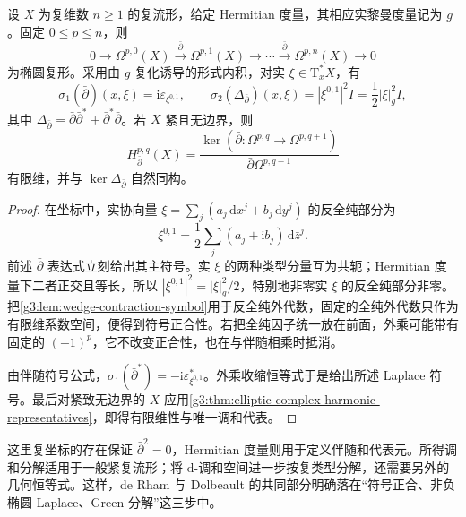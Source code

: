 \begin{proposition}\label{g3:prop:dolbeault-elliptic-symbol}
	设 \(X\) 为复维数 \(n\ge1\) 的复流形，给定 Hermitian 度量，其相应实黎曼度量记为 \(g\)。固定 \(0\le p\le n\)，则
	\[
		0\longrightarrow\Omega^{p,0}(X)\xrightarrow{\bar\partial}
		\Omega^{p,1}(X)\longrightarrow\cdots
		\xrightarrow{\bar\partial}\Omega^{p,n}(X)\longrightarrow0
	\]
	为椭圆复形。采用由 \(g\) 复化诱导的形式内积，对实 \(\xi\in\mathrm T_x^*X\)，有
	\[
		\sigma_1(\bar\partial)(x,\xi)=\mathrm i\varepsilon_{\xi^{0,1}},
		\qquad
		\sigma_2(\Delta_{\bar\partial})(x,\xi)
		=|\xi^{0,1}|^2I=\frac12|\xi|_g^2I,
	\]
	其中 \(\Delta_{\bar\partial}=\bar\partial\bar\partial^*+\bar\partial^*\bar\partial\)。若 \(X\) 紧且无边界，则
	\[
		H_{\bar\partial}^{p,q}(X)
		=\frac{\ker(\bar\partial:\Omega^{p,q}\to\Omega^{p,q+1})}
		{\bar\partial\Omega^{p,q-1}}
	\]
	有限维，并与 \(\ker\Delta_{\bar\partial}\) 自然同构。
\end{proposition}
\begin{proof}
	在坐标中，实协向量 \(\xi=\sum_j(a_j\,\mathrm dx^j+b_j\,\mathrm dy^j)\) 的反全纯部分为
	\[
		\xi^{0,1}=\frac12\sum_j(a_j+\mathrm i b_j)\,\mathrm d\bar z^j.
	\]
	前述 \(\bar\partial\) 表达式立刻给出其主符号。实 \(\xi\) 的两种类型分量互为共轭；Hermitian 度量下二者正交且等长，所以 \(|\xi^{0,1}|^2=|\xi|_g^2/2\)，特别地非零实 \(\xi\) 的反全纯部分非零。把\cref{g3:lem:wedge-contraction-symbol}用于反全纯外代数，固定的全纯外代数只作为有限维系数空间，便得到符号正合性。若把全纯因子统一放在前面，外乘可能带有固定的 \((-1)^p\)，它不改变正合性，也在与伴随相乘时抵消。

	由伴随符号公式，\(\sigma_1(\bar\partial^*)=-\mathrm i\varepsilon_{\xi^{0,1}}^*\)。外乘收缩恒等式于是给出所述 Laplace 符号。最后对紧致无边界的 \(X\) 应用\cref{g3:thm:elliptic-complex-harmonic-representatives}，即得有限维性与唯一调和代表。
\end{proof}

这里复坐标的存在保证 \(\bar\partial^2=0\)，Hermitian 度量则用于定义伴随和代表元。所得调和分解适用于一般紧复流形；将 \(\mathrm d\)-调和空间进一步按复类型分解，还需要另外的几何恒等式。这样，de Rham 与 Dolbeault 的共同部分明确落在“符号正合、非负椭圆 Laplace、Green 分解”这三步中。
